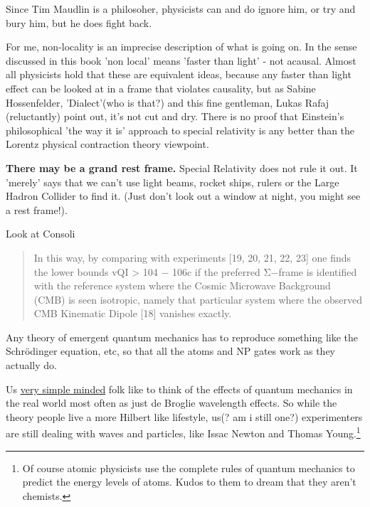 \documentclass[../rzero]{subfiles}
\begin{document}
Since Tim Maudlin is a philosoher, physicists can and do ignore him, or try and bury him\cite{Werner2014}, but he does fight back\cite{WMaudlin2014}. 

For me, non-locality is an imprecise description of what is going on. In the sense discussed in this book 'non local' means 'faster than light' - not acausal. Almost all physicists hold that these are equivalent ideas, because any faster than light effect can be looked at in a frame that violates causality, but as Sabine Hossenfelder\cite{sabinehossenfelderThinkFasterLight2023}, 'Dialect'(who is that?)\cite{dialectWhatTimeDilation2023} and this fine gentleman, Lukas Rafaj (reluctantly)\cite{physics-problemsandsolutionsOneWaySpeed2023} point out, it's not cut and dry. There is no proof that Einstein's philosophical 'the way it is' approach to special relativity is any better than the Lorentz physical contraction theory viewpoint. 

\textbf{There may be a grand rest frame.} Special Relativity does not rule it out. It 'merely' says that we can't use light beams, rocket ships, rulers or the Large Hadron Collider to find it. (Just don't look out a window at night, you might see a rest frame!).

Look at Consoli 

\begin{quotation}
	In this way, by comparing with experiments [19, 20, 21, 22, 23] one finds the lower bounds vQI > 104 − 106c if the preferred Σ−frame is identified with the reference system where the Cosmic Microwave Background (CMB) is seen isotropic, namely that particular system where the observed CMB Kinematic Dipole [18] vanishes exactly. 
\end{quotation}

Any theory of emergent quantum mechanics has to reproduce something like the Schrödinger equation, etc, so that all the atoms and NP gates work as they actually do. 


Us \href{https://youtu.be/p5nWKkyzh_Y?si=eSFOG0lw4fJo7tO2&t=1153}{very simple minded} folk\cite{instituteforadvancedstudySpacetimeQuantumMechanics2021} like to think of the effects of quantum mechanics in the real world most often as just de Broglie wavelength effects. So while the theory people live a more Hilbert like lifestyle, us(? am i still one?) experimenters are still dealing with waves and particles, like Issac Newton and Thomas Young.\footnote{Of course atomic physicists use the complete rules of quantum mechanics to predict the energy levels of atoms. Kudos to them to dream that they aren't chemists.} 
\end{document}
